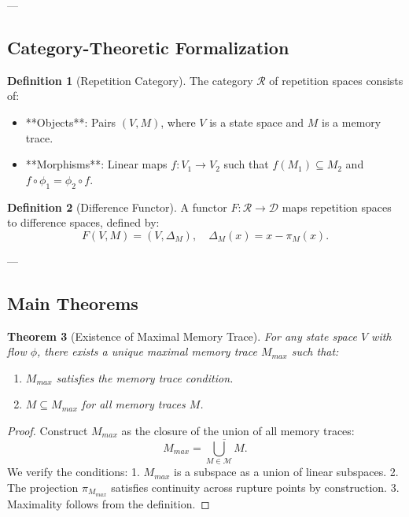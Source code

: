 \documentclass[12pt]{article}
\theoremstyle{plain}
\newtheorem{theorem}{Theorem}[section]
\theoremstyle{definition}
\newtheorem{definition}[theorem]{Definition}
\begin{document}
---

\subsection{Category-Theoretic Formalization}

\begin{definition}[Repetition Category]
The category \( \mathscr{R} \) of repetition spaces consists of:
\begin{itemize}
    \item **Objects**: Pairs \( (V, M) \), where \( V \) is a state space and \( M \) is a memory trace.
    \item **Morphisms**: Linear maps \( f: V_1 \to V_2 \) such that \( f(M_1) \subseteq M_2 \) and \( f \circ \phi_1 = \phi_2 \circ f \).
\end{itemize}
\end{definition}

\begin{definition}[Difference Functor]
A functor \( F: \mathscr{R} \to \mathscr{D} \) maps repetition spaces to difference spaces, defined by:
\[
F(V, M) = (V, \Delta_M), \quad \Delta_M(x) = x - \pi_M(x).
\]
\end{definition}

---

\subsection{Main Theorems}

\begin{theorem}[Existence of Maximal Memory Trace]
For any state space \( V \) with flow \( \phi \), there exists a unique maximal memory trace \( M_{max} \) such that:
\begin{enumerate}
    \item \( M_{max} \) satisfies the memory trace condition.
    \item \( M \subseteq M_{max} \) for all memory traces \( M \).
\end{enumerate}
\end{theorem}

\begin{proof}
Construct \( M_{max} \) as the closure of the union of all memory traces:
\[
M_{max} = \overline{\bigcup_{M \in \mathcal{M}} M}.
\]
We verify the conditions:
1. \( M_{max} \) is a subspace as a union of linear subspaces.
2. The projection \( \pi_{M_{max}} \) satisfies continuity across rupture points by construction.
3. Maximality follows from the definition.
\end{proof}
\end{document}
